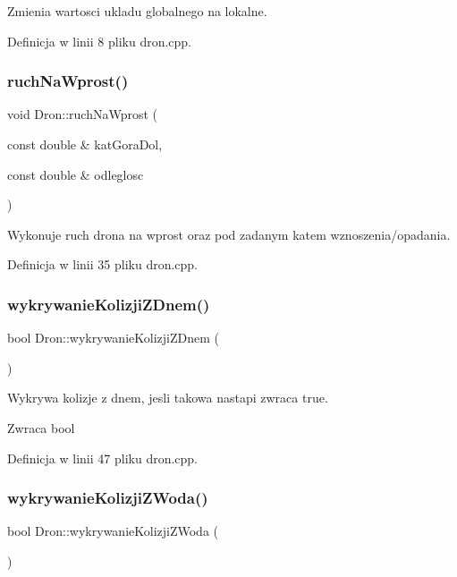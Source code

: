 Zmienia wartosci ukladu globalnego na lokalne. 

Definicja w linii 8 pliku dron.\+cpp.

\mbox{\label{class_dron_a63285f1fc20adaf5808550654b815ae5}} 
\subsubsection{\texorpdfstring{ruchNaWprost()}{ruchNaWprost()}}
{\footnotesize\ttfamily void Dron\+::ruch\+Na\+Wprost (\begin{DoxyParamCaption}\item[{const double \&}]{kat\+Gora\+Dol,  }\item[{const double \&}]{odleglosc }\end{DoxyParamCaption})}

Wykonuje ruch drona na wprost oraz pod zadanym katem wznoszenia/opadania. 

Definicja w linii 35 pliku dron.\+cpp.

\mbox{\label{class_dron_a50dfaf809be907460d95b7bccb4897a2}} 
\subsubsection{\texorpdfstring{wykrywanieKolizjiZDnem()}{wykrywanieKolizjiZDnem()}}
{\footnotesize\ttfamily bool Dron\+::wykrywanie\+Kolizji\+Z\+Dnem (\begin{DoxyParamCaption}{ }\end{DoxyParamCaption})}

Wykrywa kolizje z dnem, jesli takowa nastapi zwraca true.

\begin{DoxyReturn}{Zwraca}
bool 
\end{DoxyReturn}


Definicja w linii 47 pliku dron.\+cpp.

\mbox{\label{class_dron_a580bc95d42e4ef68b5e97e2ec1dfd629}} 
\subsubsection{\texorpdfstring{wykrywanieKolizjiZWoda()}{wykrywanieKolizjiZWoda()}}
{\footnotesize\ttfamily bool Dron\+::wykrywanie\+Kolizji\+Z\+Woda (\begin{DoxyParamCaption}{ }\end{DoxyParamCaption})}

